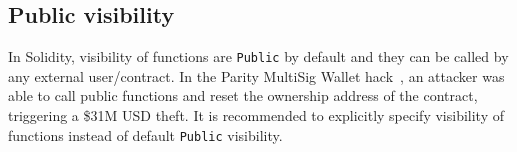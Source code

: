 \subsection{Public visibility}\label{subsec:pvis}
In Solidity, visibility of functions are \texttt{Public} by default and they can be called by any external user/contract. In the Parity MultiSig Wallet hack~\cite{ParityFirstHack}, an attacker was able to call public functions and reset the ownership address of the contract, triggering a \$31M USD theft. It is recommended to explicitly specify visibility of functions instead of default \texttt{Public} visibility.
